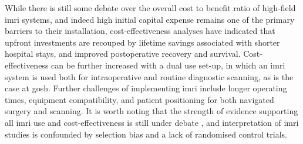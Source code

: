While there is still some debate over the overall cost to benefit ratio of high-field \gls{imri} systems\autocite{Eljamel2016,Giordano2016a,Giussani2022}, and indeed high initial capital expense remains one of the primary barriers to their installation, cost-effectiveness analyses have indicated that upfront investments are recouped by lifetime savings associated with shorter hospital stays, and improved postoperative recovery and survival\autocite{Giordano2016a,Sacino2018}.
Cost-effectiveness can be further increased with a dual use set-up, in which an \gls{imri} system is used both for intraoperative and routine diagnostic scanning\autocite{Giordano2016a}, as is the case at \gls{gosh}.
Further challenges of implementing \gls{imri} include longer operating times, equipment compatibility, and patient positioning for both navigated surgery and scanning\autocite{Giordano2017}.
It is worth noting that the strength of evidence supporting all \gls{imri} use and cost-effectiveness is still under debate \autocite{Jenkinson2018,Garzon-Muvdi2019,Caras2020}, and interpretation of \gls{imri} studies is confounded by selection bias and a lack of randomised control trials\autocite{Kubben2011}.


